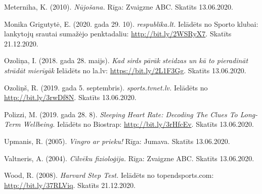\documentclass[12pt]{article}
\begin{document}
\begin{thebibliography}{9}
Meterniha, K. (2010). \textit{Nūjošana.} Rīga: Zvaigzne ABC. Skatīts 13.06.2020.

Monika Grigutytė, E. (2020. gada 29. 10). \textit{respublika.lt.} Ielādēts no Sporto klubai: lankytojų srautai sumažėjo penktadaliu: \url{http://bit.ly/2WSRyX7}. Skatīts 21.12.2020.

Ozoliņa, I. (2018. gada 28. maijs). \textit{Kad sirds pārāk steidzas un kā to pieradināt strādāt mierīgāk} Ielādēts no la.lv: \url{https://bit.ly/2L1F3Gg}. Skatīts 13.06.2020.

Ozoliņš, R. (2019. gada 5. septembris). \textit{sports.tvnet.lv.} Ielādēts no \url{http://bit.ly/3rwDf8N}. Skatīts 13.06.2020.

Polizzi, M. (2019. gada 28. 8). \textit{Sleeping Heart Rate: Decoding The Clues To Long-Term Wellbeing.} Ielādēts no Biostrap: \url{http://bit.ly/3rHfcEv}. Skatīts 13.06.2020.

Upmanis, R. (2005). \textit{Vingro ar prieku!} Rīga: Jumava. Skatīts 13.06.2020.

Valtneris, A. (2004). \textit{Cilvēku fizioloģija.} Rīga: Zvaigzne ABC. Skatīts 13.06.2020.

Wood, R. (2008). \textit{Harvard Step Test.} Ielādēts no topendsports.com: \url{http://bit.ly/37RLViq}. Skatīts 21.12.2020.
\end{thebibliography} 
\end{document}
